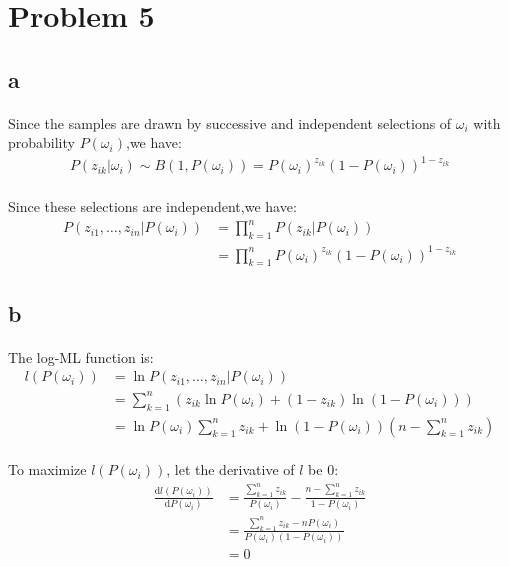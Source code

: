 \documentclass[]{article}
\begin{document}
    \section{Problem 5}
        \subsection{a}
            \paragraph{}Since the samples are drawn by successive and independent selections of $\omega_i$ with probability $P(\omega_i)$,we have:
            \begin{align*}
P(z_{ik}|\omega_i) \sim B(1,P(\omega_i)) = P(\omega_i)^{z_{ik}}(1-P(\omega_i))^{1-z_{ik}}
            \end{align*}
            \paragraph{}Since these selections are independent,we have:
            \begin{align*}
P(z_{i1},\dots,z_{in}|P(\omega_i)) 
&= \prod_{k=1}^n P(z_{ik}|P(\omega_i))\\
&= \prod_{k=1}^n P(\omega_i)^{z_{ik}}(1-P(\omega_i))^{1-z_{ik}}
            \end{align*}
        \subsection{b}
            \paragraph{}The log-ML function is:
            \begin{align*}
l(P(\omega_i)) 
&= \ln P(z_{i1},\dots,z_{in}|P(\omega_i)) \\
&= \sum_{k=1}^n (z_{ik}\ln{P(\omega_i)}+(1-z_{ik})\ln{(1-P(\omega_i))}) \\
&= \ln{P(\omega_i)}\sum_{k=1}^n{z_{ik}} + \ln{(1-P(\omega_i))}(n-\sum_{k=1}^n{z_{ik}})
            \end{align*}
            \paragraph{} To maximize $l(P(\omega_i))$, let the derivative of $l$ be $0$:
            \begin{align*}
\frac{\mathrm{d}l(P(\omega_i))}{\mathrm{d}P(\omega_i)} 
&= \frac{\sum_{k=1}^n{z_{ik}}}{P(\omega_i)} - 
   \frac{n-\sum_{k=1}^n{z_{ik}}}{1-P(\omega_i)} \\
&= \frac{ \sum_{k=1}^n{z_{ik}} - nP(\omega_i)}{P(\omega_i)(1-P(\omega_i))} \\
&= 0
            \end{align*}
\end{document}
